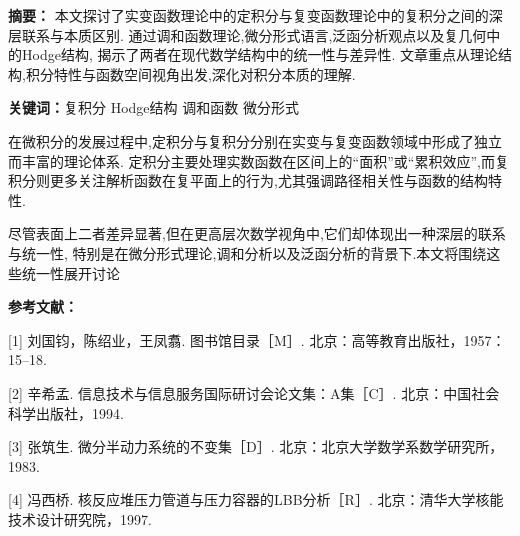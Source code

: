 \documentclass[a4paper]{article}
\begin{document}
{\fangsong\fontsize{12pt}{14pt}\selectfont

\noindent \textbf{摘要：}
本文探讨了实变函数理论中的定积分与复变函数理论中的复积分之间的深层联系与本质区别.
通过调和函数理论,微分形式语言,泛函分析观点以及复几何中的Hodge结构,
揭示了两者在现代数学结构中的统一性与差异性.
文章重点从理论结构,积分特性与函数空间视角出发,深化对积分本质的理解.

\vspace{\baselineskip}

\noindent \textbf{关键词：}\quad 复积分 \quad Hodge结构 \quad 调和函数 \quad 微分形式

\vspace{\baselineskip}


在微积分的发展过程中,定积分与复积分分别在实变与复变函数领域中形成了独立而丰富的理论体系.
定积分主要处理实数函数在区间上的“面积”或“累积效应”,而复积分则更多关注解析函数在复平面上的行为,尤其强调路径相关性与函数的结构特性.
\par 尽管表面上二者差异显著,但在更高层次数学视角中,它们却体现出一种深层的联系与统一性,
特别是在微分形式理论,调和分析以及泛函分析的背景下.本文将围绕这些统一性展开讨论

\vspace{\baselineskip}

\noindent \textbf{参考文献：}

\vspace{0.5\baselineskip}

[1] 刘国钧，陈绍业，王凤翥. 图书馆目录［M］. 北京：高等教育出版社，1957：15–18.

[2] 辛希孟. 信息技术与信息服务国际研讨会论文集：A集［C］. 北京：中国社会科学出版社，1994.

[3] 张筑生. 微分半动力系统的不变集［D］. 北京：北京大学数学系数学研究所，1983.

[4] 冯西桥. 核反应堆压力管道与压力容器的LBB分析［R］. 北京：清华大学核能技术设计研究院，1997.

}
\end{document}

